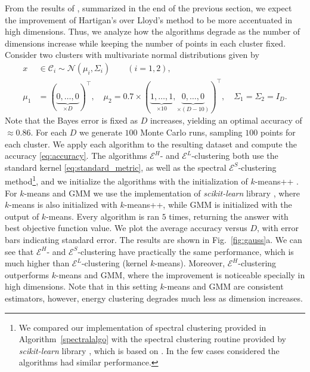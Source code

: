 \documentclass[aps,preprint,nofootinbib,floatfix]{revtex4-1}
\newcommand\C{{\mathcal{C}}}
\begin{document}
From the results of \cite{Telgarsky}, summarized in the end of the previous
section, we expect the improvement of Hartigan's 
over Lloyd's method to be more accentuated in high dimensions.
Thus, we analyze
how the algorithms degrade as the number of dimensions increase while
keeping the number of points in each cluster fixed.
Consider
two clusters with multivariate normal distributions given by
\begin{equation}
\label{eq:gauss1}
\begin{split}
x &\in \C_i  \sim 
\mathcal{N}(\mu_i,\Sigma_i) \qquad (i=1,2),  \\
\mu_1 &= (\underbrace{0,\dotsc,0}_{\times D})^\top , \quad
\mu_2 = 0.7 \times (\underbrace{1,\dots,1}_{\times 10},
\underbrace{0,\dots,0}_{\times (D-10)})^\top, \quad
\Sigma_1 = \Sigma_2 = I_D.
\end{split}
\end{equation}
Note that the Bayes error
is fixed as $D$ increases, yielding an optimal 
accuracy of $\approx 0.86$.
For each $D$ we generate $100$ Monte Carlo runs, 
sampling $100$ points for each cluster.
We apply each algorithm to the resulting dataset 
and compute the accuracy \eqref{eq:accuracy}. The algorithms
$\mathcal{E}^H$- and $\mathcal{E}^L$-clustering
both use the standard
kernel \eqref{eq:standard_metric}, as well as the spectral
$\mathcal{E}^S$-clustering method\footnote{We
compared our implementation of spectral clustering provided in
Algorithm~\ref{spectralalgo} with the spectral clustering routine provided
by \emph{scikit-learn} library \cite{scikit-learn}, 
which is based on \cite{Malik}. In the few
cases considered the algorithms had similar performance.
}, 
and we initialize the algorithms
with the initialization of $k$-means++ \cite{Vassilvitskii}.
For $k$-means and GMM we use the implementation of \emph{scikit-learn} library
\cite{scikit-learn}, where $k$-means is also initialized with $k$-means++,
while GMM is initialized with the output of $k$-means. Every algorithm
is ran $5$ times, returning the answer with best objective function value.
We plot the average accuracy versus $D$, with error bars indicating
standard error.
The results are shown in Fig.~\ref{fig:gauss}a. We can see that
$\mathcal{E}^H$- and $\mathcal{E}^S$-clustering have practically
the same performance, which is 
much higher than $\mathcal{E}^L$-clustering (kernel
$k$-means). Moreover, $\mathcal{E}^H$-clustering outperforms 
$k$-means and GMM, where the improvement is noticeable specially in 
high dimensions.
Note that in this setting $k$-means and GMM are consistent estimators,
however, energy clustering degrades much less as dimension increases.
\end{document}
